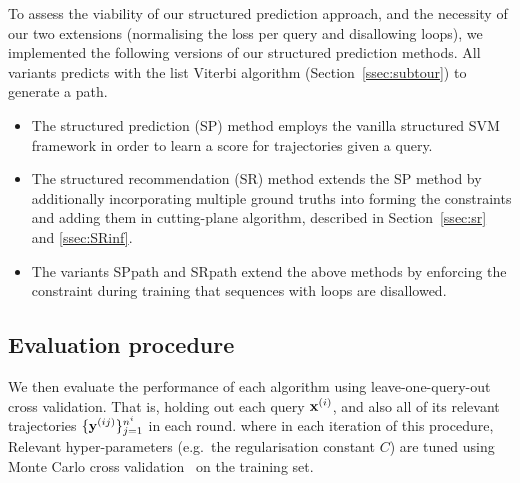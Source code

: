 To assess the viability of our structured prediction approach, and the necessity of our two extensions (normalising the loss per query and disallowing loops), we implemented the following versions of our structured prediction methods. 
All variants predicts with the list Viterbi algorithm (Section~\ref{ssec:subtour}) to generate a path.
\begin{itemize}[leftmargin=0.125in]\itemmoveup
\parskip -.05em
	\item The structured prediction ({\sc SP}) method employs the vanilla structured SVM framework in order to learn a score for trajectories given a query.  

	\item The structured recommendation ({\sc SR}) method extends the {\sc SP} method by additionally incorporating multiple ground truths into 
	forming the constraints and adding them in cutting-plane algorithm, 
	described in Section~\ref{ssec:sr} and \ref{ssec:SRinf}. 

	\item The variants {\sc SPpath} and {\sc SRpath} extend the above methods by enforcing the constraint during training that sequences with loops are disallowed.
\end{itemize}\itemmoveup


\secmoveup
\subsection{Evaluation procedure}
\textmoveup

We then evaluate the performance of each algorithm using leave-one-query-out cross validation. That is, holding out each query $\mathbf{x}^{({i})}$, and also all of its relevant trajectories $\{\mathbf{y}^{({ij})}\}_{j=1}^{n^i}$ in each round. 
where in each iteration of this procedure,
Relevant hyper-parameters (e.g.\ the regularisation constant $C$) are tuned using Monte Carlo cross validation~\cite{burman1989comparative} on the training set.

